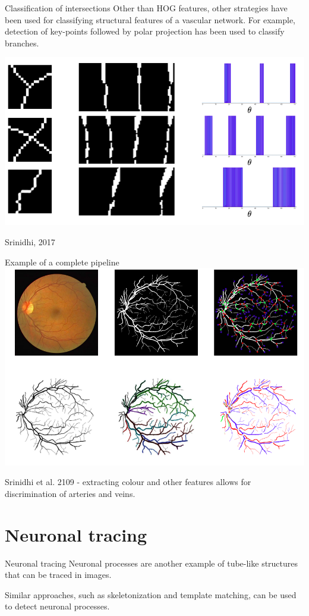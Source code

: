 \documentclass[9pt, aspectratio=169]{beamer}
\begin{document}
\begin{frame}
    {Classification of intersections}
    Other than HOG features, other strategies have been used for classifying structural features of a vascular network. For example, detection of key-points followed by polar projection has been used to classify branches.

    \centering
    \includegraphics[width=.7\textwidth]
    {polar_map_classification_intersections.png}

    \footnotesize
    \raggedright
    Srinidhi, 2017
\end{frame}

\begin{frame}
    {Example of a complete pipeline}
    \centering
    \includegraphics[width=.8\textwidth]{retina_pipeline.png}

    \footnotesize
    Srinidhi et al. 2109 - extracting colour and other features allows for discrimination of arteries and veins.
\end{frame}

\section{Neuronal tracing}

\begin{frame}
    {Neuronal tracing}
    Neuronal processes are another example of tube-like structures that can be traced in images.

    Similar approaches, such as skeletonization and template matching, can be used to detect neuronal processes.
\end{frame}
\end{document}
